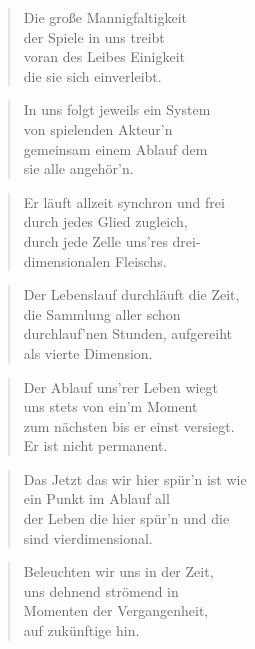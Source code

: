\documentclass[10pt,a4paper]{article}
\begin{document}
\begin{paracol}{2}
\begin{verse}
Die große Mannigfaltigkeit \\
der Spiele in uns treibt \\
voran des Leibes Einigkeit \\
die sie sich einverleibt. \\
\end{verse}

\begin{verse}
In uns folgt jeweils ein System \\
von spielenden Akteur’n \\
gemeinsam einem Ablauf dem \\
sie alle angehör’n. \\
\end{verse}

\begin{verse}
Er läuft allzeit synchron und frei \\
durch jedes Glied zugleich, \\
durch jede Zelle uns’res drei- \\
dimensionalen Fleischs. \\
\end{verse}

\begin{verse}
Der Lebenslauf durchläuft die Zeit, \\
die Sammlung aller schon \\
durchlauf’nen Stunden, aufgereiht \\
als vierte Dimension. \\
\end{verse}

\begin{verse}
Der Ablauf uns’rer Leben wiegt \\
uns stets von ein’m Moment \\
zum nächsten bis er einst versiegt. \\
Er ist nicht permanent. \\
\end{verse}

\begin{verse}
Das Jetzt das wir hier spür’n ist wie \\
ein Punkt im Ablauf all \\
der Leben die hier spür’n und die \\
sind vierdimensional. \\
\end{verse}

\begin{verse}
Beleuchten wir uns in der Zeit, \\
uns dehnend strömend in \\
Momenten der Vergangenheit, \\
auf zukünftige hin. \\
\end{verse}


\end{paracol}
\end{document}
